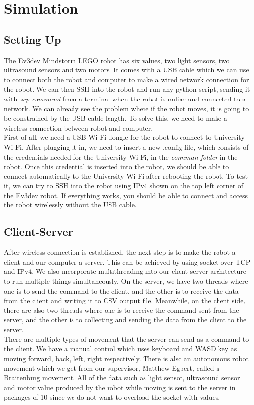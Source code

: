 \documentclass[a4paper]{article}
\begin{document}
\section{Simulation}
\subsection{Setting Up}
The Ev3dev Mindstorm LEGO robot has six values, two light sensors, two ultrasound sensors and two motors. It comes with a USB cable which we can use to connect both the robot and computer to make a wired network connection for the robot. We can then SSH into the robot and run any python script, sending it with \emph{scp command} from a terminal when the robot is online and connected to a network. We can already see the problem where if the robot moves, it is going to be constrained by the USB cable length. To solve this, we need to make a wireless connection between robot and computer. 
\\\newline
First of all, we need a USB Wi-Fi dongle for the robot to connect to University Wi-Fi. After plugging it in, we need to insert a new .config file, which consists of the credentials needed for the University Wi-Fi, in the \emph{connman folder} in the robot. Once this credential is inserted into the robot, we should be able to connect automatically to the University Wi-Fi after rebooting the robot. To test it, we can try to SSH into the robot using IPv4 shown on the top left corner of the Ev3dev robot. If everything works, you should be able to connect and access the robot wirelessly without the USB cable.
\subsection{Client-Server}
After wireless connection is established, the next step is to make the robot a client and our computer a server. This can be achieved by using socket over TCP and IPv4. We also incorporate multithreading into our client-server architecture to run multiple things simultaneously. On the server, we have two threads where one is to send the command to the client, and the other is to receive the data from the client and writing it to CSV output file. Meanwhile, on the client side, there are also two threads where one is to receive the command sent from the server, and the other is to collecting and sending the data from the client to the server.
\\\newline
There are multiple types of movement that the server can send as a command to the client. We have a manual control which uses keyboard and WASD key as moving forward, back, left, right respectively. There is also an autonomous robot movement which we got from our supervisor, Matthew Egbert, called a Braitenburg movement. All of the data such as light sensor, ultrasound sensor and motor value produced by the robot while moving is sent to the server in packages of 10 since we do not want to overload the socket with values.
\end{document}
